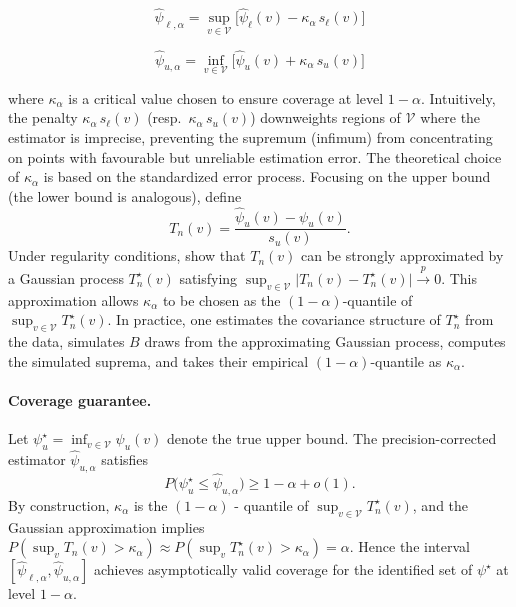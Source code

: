 \documentclass[accepted]{uai2026} %
\theoremstyle{plain}
\theoremstyle{definition}
\theoremstyle{remark}
\begin{document}
\begin{minipage}{0.48\linewidth}
\begin{equation}
\hat{\psi}_{\ell,\alpha}
  = \sup_{v \in \mathcal{V}}
    \bigl[\hat{\psi}_\ell(v) - \kappa_\alpha\,s_\ell(v)\bigr]
\end{equation}
\end{minipage}\hfill
\begin{minipage}{0.48\linewidth}
\begin{equation}
\hat{\psi}_{u,\alpha}
  = \inf_{v \in \mathcal{V}}
    \bigl[\hat{\psi}_u(v) + \kappa_\alpha\,s_u(v)\bigr]
\end{equation}
\end{minipage}
where $\kappa_\alpha$ is a critical value chosen to ensure coverage at level
$1-\alpha$.
Intuitively, the penalty $\kappa_\alpha\,s_\ell(v)$ (resp.\ $\kappa_\alpha\,s_u(v)$)
downweights regions of $\mathcal{V}$ where the estimator is imprecise,
preventing the supremum (infimum) from concentrating on points with
favourable but unreliable estimation error.
The theoretical choice of $\kappa_\alpha$ is based on the standardized error
process.
Focusing on the upper bound (the lower bound is analogous), define
\begin{equation}
T_n(v)
  = \frac{\hat{\psi}_u(v) - \psi_u(v)}{s_u(v)}.
\end{equation}
Under regularity conditions, \citeauthor{chernozhukov2013intersection} show
that $T_n(v)$ can be strongly approximated by a Gaussian process
$T_n^\star(v)$ satisfying
$\sup_{v \in \mathcal{V}}
  \bigl|T_n(v) - T_n^\star(v)\bigr|
  \xrightarrow{p} 0$.
This approximation allows $\kappa_\alpha$ to be chosen as the
$(1-\alpha)$-quantile of $\sup_{v \in \mathcal{V}} T_n^\star(v)$.
In practice, one estimates the covariance structure of $T_n^\star$ from the
data, simulates $B$ draws from the approximating Gaussian process, computes
the simulated suprema, and takes their empirical $(1-\alpha)$-quantile as
$\kappa_\alpha$.

\paragraph{Coverage guarantee.}
Let $\psi_u^\star = \inf_{v \in \mathcal{V}} \psi_u(v)$ denote the true
upper bound.
The precision-corrected estimator $\hat{\psi}_{u,\alpha}$ satisfies
\begin{equation}
P\bigl(\psi_u^\star \leq \hat{\psi}_{u,\alpha}\bigr)
  \geq 1 - \alpha + o(1).
\end{equation}
By construction, $\kappa_\alpha$ is the $(1-\alpha)$ - quantile of
$\sup_{v \in \mathcal{V}} T_n^\star(v)$, and the Gaussian approximation
implies
$P(\sup_{v} T_n(v) > \kappa_\alpha) \approx P(\sup_{v} T_n^\star(v) > \kappa_\alpha)
  = \alpha$.
Hence the interval
$[\hat{\psi}_{\ell,\alpha}, \hat{\psi}_{u,\alpha}]$ achieves asymptotically
valid coverage for the identified set of $\psi^\star$ at level $1-\alpha$.
\end{document}
